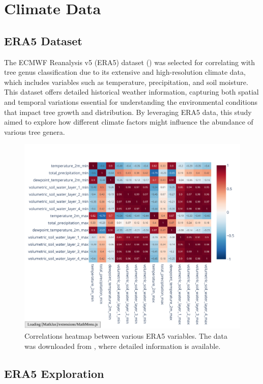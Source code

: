 \chapter{Climate Data}
\label{chapter:climate}
\section{ERA5 Dataset}

The ECMWF Reanalysis v5 (ERA5) dataset (\cite{era5}) was selected for correlating with tree genus classification due to its extensive and high-resolution climate data, which includes variables such as temperature, precipitation, and soil moisture. This dataset offers detailed historical weather information, capturing both spatial and temporal variations essential for understanding the environmental conditions that impact tree growth and distribution. By leveraging ERA5 data, this study aimed to explore how different climate factors might influence the abundance of various tree genera.

\begin{figure}[ht]
    \centering
    \includegraphics[width=0.96\linewidth, trim={20pt 20pt 10pt 40pt}, clip]{figures/figures_climate/weather_correlations.pdf}
    \caption{Correlations heatmap between various ERA5 variables. The data was downloaded from \cite{era5_dataset}, where detailed information is available.}
    \label{fig:weather_correlations}
\end{figure}

\section{ERA5 Exploration}

